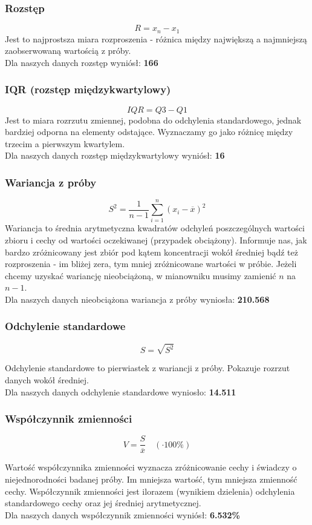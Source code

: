 \documentclass{article}
\theoremstyle{break}
\begin{document}
	\subsubsection*{Rozstęp}
	$$R=x_n-x_1$$
	Jest to najprostsza miara rozproszenia - różnica między największą a najmniejszą zaobserwowaną wartością z próby. 
	\\Dla naszych danych rozstęp wyniósł: \textbf{166}
	
	\subsubsection*{IQR (rozstęp międzykwartylowy)}
	$$IQR=Q3-Q1$$
	Jest to miara rozrzutu zmiennej, podobna do odchylenia standardowego, jednak bardziej odporna na elementy odstające. Wyznaczamy go jako różnicę między trzecim a pierwszym kwartylem.
	\\Dla naszych danych rozstęp międzykwartylowy wyniósł: \textbf{16}
	\subsubsection*{Wariancja z próby}
	$$S^2=\frac{1}{n-1}\sum\limits_{i=1}^{n}(x_i - \overline{x})^2$$
	Wariancja to średnia arytmetyczna kwadratów odchyleń poszczególnych wartości zbioru i cechy od wartości oczekiwanej (przypadek obciążony).  Informuje nas, jak bardzo zróżnicowany jest zbiór pod kątem koncentracji wokół średniej bądź też rozproszenia - im bliżej zera, tym mniej zróżnicowane wartości w próbie. Jeżeli chcemy uzyskać wariancję nieobciążoną, w mianowniku musimy zamienić $n$ na $n-1$.
	\\Dla naszych danych nieobciążona wariancja z próby wyniosła: \textbf{210.568}
	\subsubsection*{Odchylenie standardowe}
	
	$$S=\sqrt{S^2}$$
	
	Odchylenie standardowe to pierwiastek z wariancji z próby. Pokazuje rozrzut danych wokół średniej.
	\\Dla naszych danych odchylenie standardowe wyniosło: \textbf{14.511}
	
	\subsubsection*{Współczynnik zmienności}
	$$V=\frac{S}{\overline{x}} \quad (\cdot 100\%)$$
	
	Wartość współczynnika zmienności wyznacza zróżnicowanie cechy i świadczy o niejednorodności badanej próby. Im mniejsza wartość, tym mniejsza zmienność cechy. Współczynnik zmienności jest ilorazem (wynikiem dzielenia) odchylenia standardowego cechy oraz jej średniej arytmetycznej.
	\\Dla naszych danych współczynnik zmienności wyniósł: \textbf{6.532\%}
	
\end{document}
